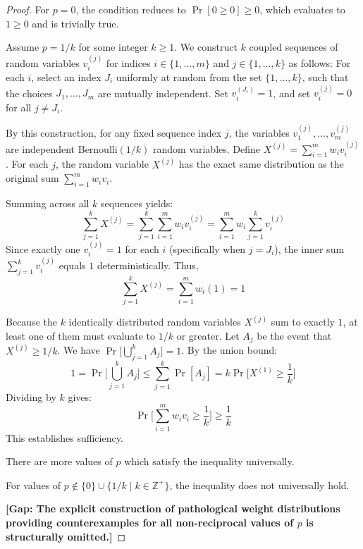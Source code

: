 \documentclass[12pt]{article}
\newcommand{\review}[1]{\begin{reviewbox}#1\end{reviewbox}}
\begin{document}
\begin{proof}
For $p = 0$, the condition reduces to $\Pr[0 \ge 0] \ge 0$, which evaluates to $1 \ge 0$ and is trivially true.

Assume $p = 1/k$ for some integer $k \ge 1$. 
We construct $k$ coupled sequences of random variables $v_i^{(j)}$ for indices $i \in \{1, \dots, m\}$ and $j \in \{1, \dots, k\}$ as follows:
For each $i$, select an index $J_i$ uniformly at random from the set $\{1, \dots, k\}$, such that the choices $J_1, \ldots, J_m$ are mutually independent. 
Set $v_i^{(J_i)} = 1$, and set $v_i^{(j)} = 0$ for all $j \neq J_i$.

By this construction, for any fixed sequence index $j$, the variables $v_1^{(j)}, \ldots, v_m^{(j)}$ are independent Bernoulli$(1/k)$ random variables. 
Define $X^{(j)} = \sum_{i=1}^m w_i v_i^{(j)}$. 
For each $j$, the random variable $X^{(j)}$ has the exact same distribution as the original sum $\sum_{i=1}^m w_i v_i$.

Summing across all $k$ sequences yields:
\[\sum_{j=1}^k X^{(j)} = \sum_{j=1}^k \sum_{i=1}^m w_i v_i^{(j)} = \sum_{i=1}^m w_i \sum_{j=1}^k v_i^{(j)}\]
Since exactly one $v_i^{(j)} = 1$ for each $i$ (specifically when $j = J_i$), the inner sum $\sum_{j=1}^k v_i^{(j)}$ equals $1$ deterministically.
Thus,
\[\sum_{j=1}^k X^{(j)} = \sum_{i=1}^m w_i (1) = 1\]

Because the $k$ identically distributed random variables $X^{(j)}$ sum to exactly $1$, at least one of them must evaluate to $1/k$ or greater. 
Let $A_j$ be the event that $X^{(j)} \ge 1/k$. We have $\Pr\Big[\bigcup_{j=1}^k A_j\Big] = 1$.
By the union bound:
\[ 1 = \Pr\Big[\bigcup_{j=1}^k A_j\Big] \le \sum_{j=1}^k \Pr[A_j] = k \Pr\Big[X^{(1)} \ge \frac{1}{k}\Big] \]
Dividing by $k$ gives:
\[ \Pr\Big[\sum_{i=1}^m w_i v_i \ge \frac{1}{k}\Big] \ge \frac{1}{k} \]
This establishes sufficiency.

\review{There are more values of $p$ which satisfy the inequality universally. }
For values of $p \notin \{0\} \cup \{1/k \mid k \in \mathbb{Z}^+\}$, the inequality does not universally hold.

\vspace{\baselineskip}
\noindent\textbf{[Gap: The explicit construction of pathological weight distributions providing counterexamples for all non-reciprocal values of $p$ is structurally omitted.]}
\end{proof}
\end{document}
